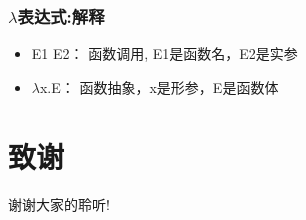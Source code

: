 \documentclass[CJKutf8,compress,hyperref]{beamer}
\begin{document}
\begin{CJK}{UTF8}{song}
\begin{frame} 
           \frametitle{ $\lambda$表达式:解释} 
         \begin{itemize}
\item{E1 E2}： 函数调用, E1是函数名，E2是实参 
\item{$\lambda$x.E}： 函数抽象，x是形参，E是函数体
\end{itemize} 

\end{frame}



  \section{致谢}
  \begin{frame}
          \begin{Huge}
                  \begin{center}
                          谢谢大家的聆听!
                  \end{center}
          \end{Huge}
  \end{frame}
\end{CJK}
\end{document}
